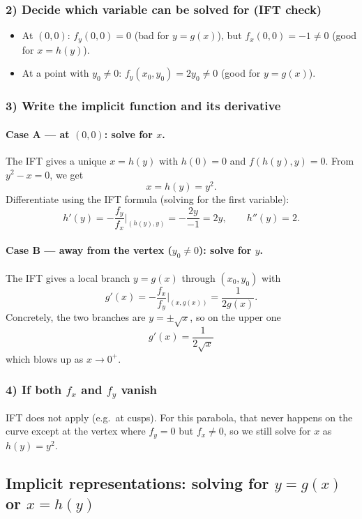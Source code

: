 \documentclass[12pt,a4paper]{article}
\theoremstyle{plain}
\theoremstyle{definition}
\theoremstyle{remark}
\theoremstyle{remark}
\begin{document}
	\subsubsection*{2) Decide which variable can be solved for (IFT check)}
	
	\begin{itemize}
		\item At $(0,0)$: $f_y(0,0)=0$ (bad for $y=g(x)$), but $f_x(0,0)=-1\neq0$ (good for $x=h(y)$).
		\item At a point with $y_0\neq0$: $f_y(x_0,y_0)=2y_0\neq0$ (good for $y=g(x)$).
	\end{itemize}
	
	\subsubsection*{3) Write the implicit function and its derivative}
	
	\paragraph{Case A — at $(0,0)$: solve for $x$.}
	The IFT gives a unique $x=h(y)$ with $h(0)=0$ and $f(h(y),y)=0$.  
	From $y^2 - x = 0$, we get
	\[
	\boxed{x = h(y) = y^2.}
	\]
	Differentiate using the IFT formula (solving for the first variable):
	\[
	h'(y) = -\frac{f_y}{f_x}\Big|_{(h(y),y)} = -\frac{2y}{-1} = 2y,
	\qquad
	h''(y) = 2.
	\]
	
	\paragraph{Case B — away from the vertex ($y_0\neq 0$): solve for $y$.}
	The IFT gives a local branch $y=g(x)$ through $(x_0,y_0)$ with
	\[
	\boxed{g'(x) = -\frac{f_x}{f_y}\Big|_{(x,g(x))} = \frac{1}{2g(x)}.}
	\]
	Concretely, the two branches are $y=\pm\sqrt{x}$, so on the upper one
	\[
	g'(x) = \frac{1}{2\sqrt{x}}
	\]
	which blows up as $x\to 0^+$.
	
	\subsubsection*{4) If both $f_x$ and $f_y$ vanish}
	IFT does not apply (e.g.\ at cusps).  
	For this parabola, that never happens on the curve except at the vertex where 
	$f_y=0$ but $f_x\neq0$, so we still solve for $x$ as $h(y)=y^2$.
	
	\subsection*{Implicit representations: solving for $y=g(x)$ or $x=h(y)$}
	
\end{document}
